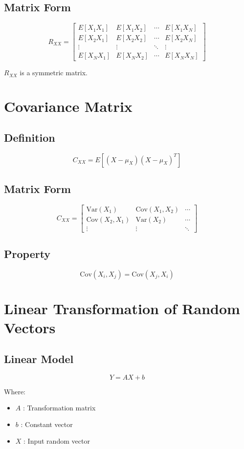 \documentclass[12pt]{article}
\begin{document}
\subsection{Matrix Form}
\[
R_{XX} =
\begin{bmatrix}
E[X_1X_1] & E[X_1X_2] & \cdots & E[X_1X_N] \\
E[X_2X_1] & E[X_2X_2] & \cdots & E[X_2X_N] \\
\vdots & \vdots & \ddots & \vdots \\
E[X_NX_1] & E[X_NX_2] & \cdots & E[X_NX_N]
\end{bmatrix}
\]

$R_{XX}$ is a symmetric matrix.

\section{Covariance Matrix}

\subsection{Definition}
\[
C_{XX} = E[(X - \mu_X)(X - \mu_X)^T]
\]

\subsection{Matrix Form}
\[
C_{XX} =
\begin{bmatrix}
\text{Var}(X_1) & \text{Cov}(X_1, X_2) & \cdots \\
\text{Cov}(X_2, X_1) & \text{Var}(X_2) & \cdots \\
\vdots & \vdots & \ddots
\end{bmatrix}
\]

\subsection{Property}
\[
\text{Cov}(X_i, X_j) = \text{Cov}(X_j, X_i)
\]

\section{Linear Transformation of Random Vectors}

\subsection{Linear Model}
\[
Y = AX + b
\]

Where:
\begin{itemize}
\item $A$ : Transformation matrix
\item $b$ : Constant vector
\item $X$ : Input random vector
\end{itemize}
\end{document}
